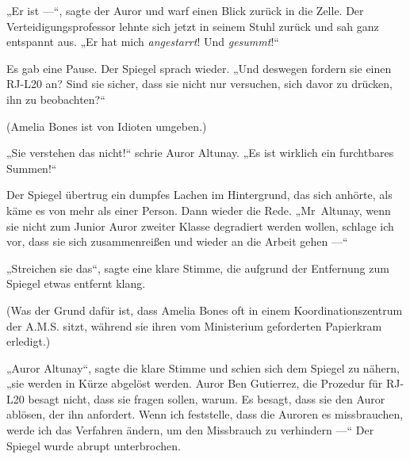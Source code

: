 „Er ist —“, sagte der Auror und warf einen Blick zurück in die Zelle. Der Verteidigungsprofessor lehnte sich jetzt in seinem Stuhl zurück und sah ganz entspannt aus.
„Er hat mich \emph{angestarrt}! Und \emph{gesummt}!“


Es gab eine Pause. Der Spiegel sprach wieder.
„Und deswegen fordern sie einen RJ-L20 an? Sind sie sicher, dass sie nicht nur versuchen, sich davor zu drücken, ihn zu beobachten?“

(Amelia Bones ist von Idioten umgeben.)

„Sie verstehen das nicht!“ schrie Auror Altunay.
„Es ist wirklich ein furchtbares Summen!“

Der Spiegel übertrug ein dumpfes Lachen im Hintergrund, das sich anhörte, als käme es von mehr als einer Person. Dann wieder die Rede.
„Mr~Altunay, wenn sie nicht zum Junior Auror zweiter Klasse degradiert werden wollen, schlage ich vor, dass sie sich zusammenreißen und wieder an die Arbeit gehen —“

„Streichen sie das“, sagte eine klare Stimme, die aufgrund der Entfernung zum Spiegel etwas entfernt klang.

(Was der Grund dafür ist, dass Amelia Bones oft in einem Koordinationszentrum der A.M.S. sitzt, während sie ihren vom Ministerium geforderten Papierkram erledigt.)

„Auror Altunay“, sagte die klare Stimme und schien sich dem Spiegel zu nähern,
„sie werden in Kürze abgelöst werden. Auror Ben Gutierrez, die Prozedur für RJ-L20 besagt nicht, dass sie fragen sollen, warum. Es besagt, dass sie den Auror ablösen, der ihn anfordert. Wenn ich feststelle, dass die Auroren es missbrauchen, werde ich das Verfahren ändern, um den Missbrauch zu verhindern —“
Der Spiegel wurde abrupt unterbrochen.

